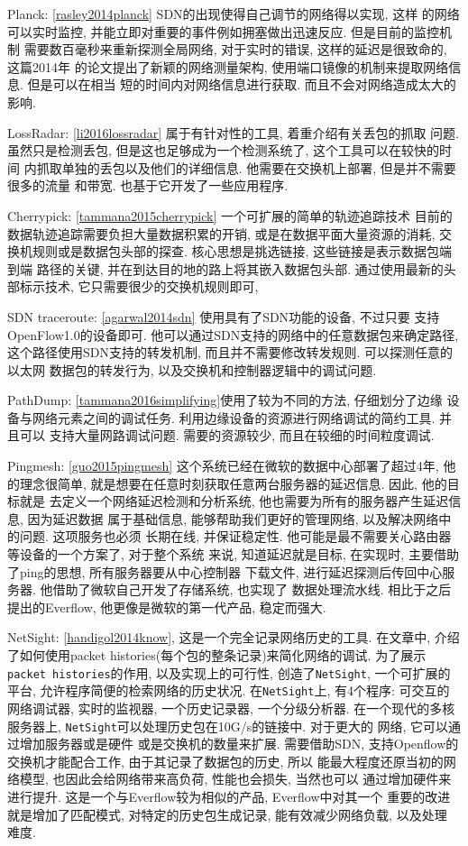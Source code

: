 {\begin{mdframed}[everyline=true]
Planck: \ref{rasley2014planck} SDN的出现使得自己调节的网络得以实现, 这样
的网络可以实时监控, 并能立即对重要的事件例如拥塞做出迅速反应.
但是目前的监控机制 需要数百毫秒来重新探测全局网络, 对于实时的错误,
这样的延迟是很致命的, 这篇2014年 的论文提出了新颖的网络测量架构,
使用端口镜像的机制来提取网络信息. 但是可以在相当
短的时间内对网络信息进行获取. 而且不会对网络造成太大的影响.

LossRadar: \ref{li2016lossradar} 属于有针对性的工具,
着重介绍有关丢包的抓取 问题. 虽然只是检测丢包,
但是这也足够成为一个检测系统了, 这个工具可以在较快的时间
内抓取单独的丢包以及他们的详细信息. 他需要在交换机上部署,
但是并不需要很多的流量 和带宽. 也基于它开发了一些应用程序.

Cherrypick: \ref{tammana2015cherrypick} 一个可扩展的简单的轨迹追踪技术
目前的数据轨迹追踪需要负担大量数据积累的开销,
或是在数据平面大量资源的消耗, 交换机规则或是数据包头部的探查.
核心思想是挑选链接, 这些链接是表示数据包端到端 路径的关键,
并在到达目的地的路上将其嵌入数据包头部. 通过使用最新的头部标示技术,
它只需要很少的交换机规则即可,

SDN traceroute: \ref{agarwal2014sdn} 使用具有了SDN功能的设备, 不过只要
支持OpenFlow1.0的设备即可.
他可以通过SDN支持的网络中的任意数据包来确定路径,
这个路径使用SDN支持的转发机制, 而且并不需要修改转发规则.
可以探测任意的以太网 数据包的转发行为,
以及交换机和控制器逻辑中的调试问题.

PathDump: \ref{tammana2016simplifying}使用了较为不同的方法,
仔细划分了边缘 设备与网络元素之间的调试任务.
利用边缘设备的资源进行网络调试的简约工具. 并且可以 支持大量网路调试问题.
需要的资源较少, 而且在较细的时间粒度调试.

Pingmesh: \ref{guo2015pingmesh}
这个系统已经在微软的数据中心部署了超过4年, 他的理念很简单,
就是想要在任意时刻获取任意两台服务器的延迟信息. 因此, 他的目标就是
去定义一个网络延迟检测和分析系统, 他也需要为所有的服务器产生延迟信息,
因为延迟数据 属于基础信息, 能够帮助我们更好的管理网络,
以及解决网络中的问题. 这项服务也必须 长期在线, 并保证稳定性.
他可能是最不需要关心路由器等设备的一个方案了, 对于整个系统 来说,
知道延迟就是目标, 在实现时, 主要借助了ping的思想,
所有服务器要从中心控制器 下载文件, 进行延迟探测后传回中心服务器.
他借助了微软自己开发了存储系统, 也实现了 数据处理流水线.
相比于之后提出的Everflow, 他更像是微软的第一代产品, 稳定而强大.

NetSight: \ref{handigol2014know}, 这是一个完全记录网络历史的工具.
在文章中, 介绍了如何使用packet
histories(每个包的整条记录)来简化网络的调试.
为了展示\texttt{packet\ histories}的作用, 以及实现上的可行性,
创造了\texttt{NetSight}, 一个可扩展的平台,
允许程序简便的检索网络的历史状况. 在\texttt{NetSight}上, 有4个程序:
可交互的网络调试器, 实时的监视器, 一个历史记录器, 一个分级分析器.
在一个现代的多核服务器上,
\texttt{NetSight}可以处理历史包在10G/s的链接中. 对于更大的 网络,
它可以通过增加服务器或是硬件 或是交换机的数量来扩展. 需要借助SDN,
支持Openflow的交换机才能配合工作, 由于其记录了数据包的历史, 所以
能最大程度还原当初的网络模型, 也因此会给网络带来高负荷, 性能也会损失,
当然也可以 通过增加硬件来进行提升. 这是一个与Everflow较为相似的产品,
Everflow中对其一个 重要的改进就是增加了匹配模式, 对特定的历史包生成记录,
能有效减少网络负载, 以及处理 难度.


\end{mdframed}}
